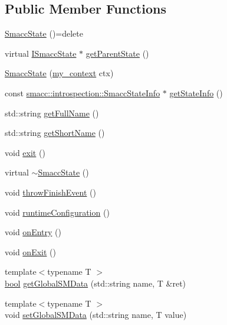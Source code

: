 \subsection*{Public Member Functions}
\begin{DoxyCompactItemize}
\item 
\hyperlink{classsmacc_1_1SmaccState_a2fbeaca0f063a909d17de2c3040c8d17}{Smacc\+State} ()=delete
\item 
virtual \hyperlink{classsmacc_1_1ISmaccState}{I\+Smacc\+State} $\ast$ \hyperlink{classsmacc_1_1SmaccState_a69fc0aa1dbe0c00501f2890616225004}{get\+Parent\+State} ()
\item 
\hyperlink{classsmacc_1_1SmaccState_adc225018fe91da47e6e9f1d20150b26a}{Smacc\+State} (\hyperlink{structsmacc_1_1SmaccState_1_1my__context}{my\+\_\+context} ctx)
\item 
const \hyperlink{classsmacc_1_1introspection_1_1SmaccStateInfo}{smacc\+::introspection\+::\+Smacc\+State\+Info} $\ast$ \hyperlink{classsmacc_1_1SmaccState_ab7825f5db39dcbee4e4384913026d3e2}{get\+State\+Info} ()
\item 
std\+::string \hyperlink{classsmacc_1_1SmaccState_a897dbdfe52a8b944d4bf1844ddcc3aa5}{get\+Full\+Name} ()
\item 
std\+::string \hyperlink{classsmacc_1_1SmaccState_a4db028a85244653e48957d2b3371413d}{get\+Short\+Name} ()
\item 
void \hyperlink{classsmacc_1_1SmaccState_a34b22a3b1af1796f2bdc1383eeef3a74}{exit} ()
\item 
virtual \hyperlink{classsmacc_1_1SmaccState_a41b2515faf76648c6d69fe09108d2691}{$\sim$\+Smacc\+State} ()
\item 
void \hyperlink{classsmacc_1_1SmaccState_a56ccdfaf818ed6409dcbd4ab8b01c60e}{throw\+Finish\+Event} ()
\item 
void \hyperlink{classsmacc_1_1SmaccState_ae92ac16fd545e45ae502bc965c46973e}{runtime\+Configuration} ()
\item 
void \hyperlink{classsmacc_1_1SmaccState_a4a10a74fdbe51a798b8d651668b8ed9a}{on\+Entry} ()
\item 
void \hyperlink{classsmacc_1_1SmaccState_a82ca7c69153e86dc5eedf3f909560f3a}{on\+Exit} ()
\item 
{\footnotesize template$<$typename T $>$ }\\\hyperlink{classbool}{bool} \hyperlink{classsmacc_1_1SmaccState_ad53b5be2760eb7ffb50f3b2e542b65f1}{get\+Global\+S\+M\+Data} (std\+::string name, T \&ret)
\item 
{\footnotesize template$<$typename T $>$ }\\void \hyperlink{classsmacc_1_1SmaccState_a98f2673b257479e0a3615d5d8279a591}{set\+Global\+S\+M\+Data} (std\+::string name, T value)

\end{DoxyCompactItemize}
